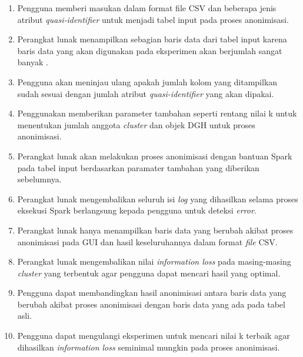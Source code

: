 \begin{enumerate}

\item Pengguna memberi masukan dalam format file CSV dan beberapa jenis atribut \textit{quasi-identifier} untuk menjadi tabel input pada proses anonimisasi.

\item Perangkat lunak menampilkan sebagian baris data dari tabel input karena baris data yang akan digunakan pada eksperimen akan berjumlah sangat banyak .

\item Pengguna akan meninjau ulang apakah jumlah kolom yang ditampilkan sudah sesuai dengan jumlah atribut \textit{quasi-identifier} yang akan dipakai.

\item Penggunakan memberikan parameter tambahan seperti rentang nilai k untuk menentukan jumlah anggota \textit{cluster} dan objek DGH untuk proses anonimisasi.

\item Perangkat lunak akan melakukan proses anonimisasi dengan bantuan Spark pada tabel input berdasarkan paramater tambahan yang diberikan sebelumnya. 

\item Perangkat lunak mengembalikan seluruh isi \textit{log} yang dihasilkan selama proses eksekusi Spark berlangsung kepada pengguna untuk deteksi \textit{error}.

\item Perangkat lunak hanya menampilkan baris data yang berubah akibat proses anonimisasi pada GUI dan hasil keseluruhannya dalam format \textit{file} CSV.

\item Perangkat lunak mengembalikan nilai \textit{information loss} pada masing-masing \textit{cluster} yang terbentuk agar pengguna dapat mencari hasil yang optimal.

\item Pengguna dapat membandingkan hasil anonimisasi antara baris data yang berubah akibat proses anonimisasi dengan baris data yang ada pada tabel asli.

\item Pengguna dapat mengulangi eksperimen untuk mencari nilai k terbaik agar dihasilkan \textit{information loss} seminimal mungkin pada proses anonimisasi.


 
\end{enumerate}

